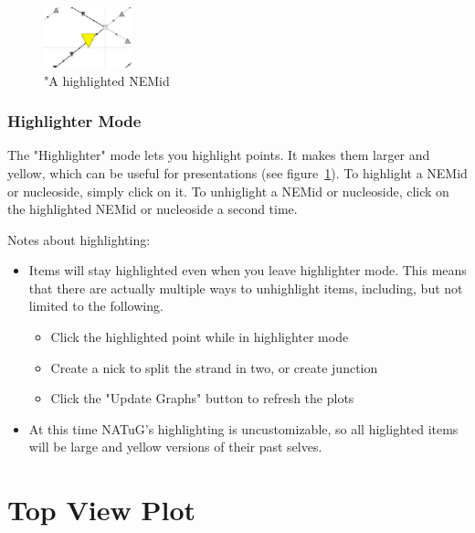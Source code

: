 \documentclass[titlepage]{article}
\begin{document}
	\begin{figure}
		\centering
		\includegraphics[width=1in]{highlighted-nemid.png}
		\caption{"A highlighted NEMid}
		\label{fig:highlighted-NEMid}
	\end{figure}

	\subsubsection{Highlighter Mode}

	The "Highlighter" mode lets you highlight points. It makes them larger and yellow, which can be useful for presentations (see figure~\ref{fig:highlighted-NEMid}). 
	To highlight a NEMid or nucleoside, simply click on it. To unhiglight a NEMid or nucleoside, click on the highlighted NEMid or nucleoside a second time.
	
	Notes about highlighting:
	\begin{itemize}
		\item Items will stay highlighted even when you leave highlighter mode. This means that there are actually multiple ways to unhighlight items, including, but not limited to the following.
		\begin{itemize}
			\item Click the highlighted point while in highlighter mode
			\item Create a nick to split the strand in two, or create junction
			\item Click the "Update Graphs" button to refresh the plots
		\end{itemize}
		\item At this time NATuG's highlighting is uncustomizable, so all higlighted items will be large and yellow versions of their past selves.
	\end{itemize}
	
	\section{Top View Plot}
	
\end{document}
